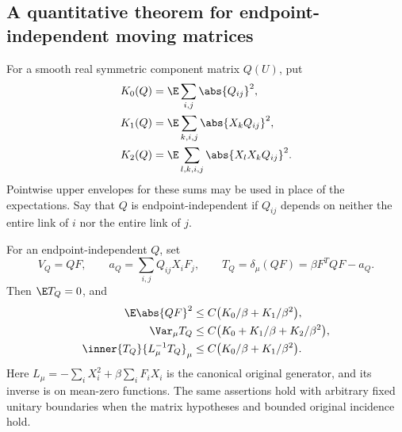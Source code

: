 \subsection{A quantitative theorem for endpoint-independent moving matrices}

For a smooth real symmetric component matrix \(Q(U)\), put
\begin{align*}
 K_0(Q)&=\E\sum_{i,j}\abs{Q_{ij}}^2,\\
 K_1(Q)&=\E\sum_{k,i,j}\abs{X_kQ_{ij}}^2,\\
 K_2(Q)&=\E\sum_{l,k,i,j}\abs{X_lX_kQ_{ij}}^2.
\end{align*}
Pointwise upper envelopes for these sums may be used in place of the
expectations. Say that \(Q\) is endpoint-independent if \(Q_{ij}\) depends on
neither the entire link of \(i\) nor the entire link of \(j\).

\begin{theorem}
\label{tr:moving}
For an endpoint-independent \(Q\), set
\begin{equation}
 V_Q=QF,\qquad
 a_Q=\sum_{i,j}Q_{ij}X_iF_j,\qquad
 T_Q=\delta_\mu(QF)=\beta F^TQF-a_Q.
 \label{tr:TQ}
\end{equation}
Then \(\E T_Q=0\), and
\begin{align}
 \E\abs{QF}^2
 &\le C\bigl(K_0/\beta+K_1/\beta^2\bigr),
 \label{tr:QF}\\
 \Var_\mu T_Q
 &\le C\bigl(K_0+K_1/\beta+K_2/\beta^2\bigr),
 \label{tr:movingvariance}\\
 \inner{T_Q}{L_\mu^{-1}T_Q}_\mu
 &\le C\bigl(K_0/\beta+K_1/\beta^2\bigr).
 \label{tr:movinginverse}
\end{align}
Here \(L_\mu=-\sum_iX_i^2+\beta\sum_iF_iX_i\) is the canonical original
generator, and its inverse is on mean-zero functions. The same assertions
hold with arbitrary fixed unitary boundaries when the matrix hypotheses
and bounded original incidence hold.
\end{theorem}

